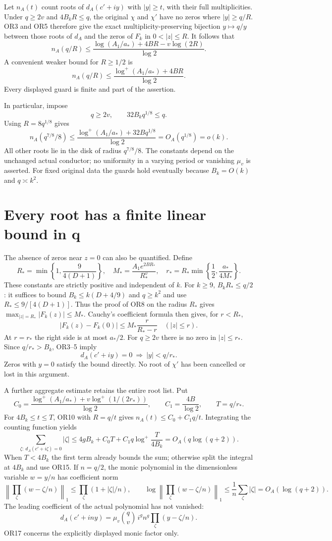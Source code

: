\documentclass[11pt]{article}
\newcommand{\lp}{\log^+}
\begin{document}
Let $n_A(t)$ count roots of $d_A(c'+iy)$ with $|y|\ge t$,
with their full multiplicities. Under $q\ge2v$ and $4B_kR\le q$,
the original $\chi$ and $\chi'$ have no zeros where $|y|\ge q/R$.
OR3 and OR5 therefore give the exact multiplicity-preserving
bijection $y\mapsto q/y$ between those roots of $d_A$ and the
zeros of $F_k$ in $0<|z|\le R$. It follows that
\[
n_A(q/R)\le
\frac{\log(A_1/a_*)+4BR-v\log(2R)}{\log2}.
\tag{OR10}
\]
A convenient weaker bound for $R\ge1/2$ is
\[
n_A(q/R)\le
\frac{\lp(A_1/a_*)+4BR}{\log2}.
\tag{OR11}
\]
Every displayed guard is finite and part of the assertion.

In particular, impose
\[
q\ge2v,\qquad 32B_kq^{1/8}\le q.
\tag{OR12}
\]
Using $R=8q^{1/8}$ gives
\[
\boxed{n_A(q^{7/8}/8)\le
\frac{\lp(A_1/a_*)+32Bq^{1/8}}{\log2}
=O_A(q^{1/8})=o(k).}
\tag{OR13}
\]
All other roots lie in the disk of radius $q^{7/8}/8$.
The constants depend on the unchanged actual conductor; no
uniformity in a varying period or vanishing $\mu_v$ is asserted.
For fixed original data the guards hold eventually because
$B_k=O(k)$ and $q\asymp k^2$.

\section{Every root has a finite linear bound in q}
The absence of zeros near $z=0$ can also be quantified. Define
\[
R_*=\min\left\{1,\frac{9}{4(D+1)}\right\},\quad
M_*=\frac{A_1e^{2BR_*}}{R_*^v},\quad
r_* = R_*\min\left\{\frac12,\frac{a_*}{4M_*}\right\}.
\tag{OR14}
\]
These constants are strictly positive and independent of $k$.
For $k\ge9$, $B_kR_*\le q/2$: it suffices to bound
$B_k\le k(D+4/9)$ and $q\ge k^2$ and use
$R_*\le9/[4(D+1)]$.
Thus the proof of OR8 on the radius $R_*$ gives
$\max_{|z|=R_*}|F_k(z)|\le M_*$.
Cauchy's coefficient formula then gives, for $r<R_*$,
\[
|F_k(z)-F_k(0)|\le M_*\frac{r}{R_*-r}
\quad(|z|\le r).
\]
At $r=r_*$ the right side is at most $a_*/2$.
For $q\ge2v$ there is no zero in $|z|\le r_*$.
Since $q/r_*>B_k$, OR3--5 imply
\[
\boxed{d_A(c'+iy)=0\ \Longrightarrow\ |y|<q/r_*.}
\tag{OR15}
\]
Zeros with $y=0$ satisfy the bound directly. No root of $\chi'$
has been cancelled or lost in this argument.

A further aggregate estimate retains the entire root list. Put
\[
C_0=\frac{\lp(A_1/a_*)+v\lp(1/(2r_*))}{\log2},\qquad
C_1=\frac{4B}{\log2},\qquad T=q/r_*.
\]
For $4B_k\le t\le T$, OR10 with $R=q/t$ gives
$n_A(t)\le C_0+C_1q/t$. Integrating the counting function yields
\[
\boxed{\sum_{\zeta:\ d_A(c'+i\zeta)=0}|\zeta|
\le 4gB_k+C_0T+C_1q\lp\frac{T}{4B_k}
=O_A(q\log(q+2)).}
\tag{OR16}
\]
When $T<4B_k$ the first term already bounds the sum; otherwise split
the integral at $4B_k$ and use OR15. If $n=q/2$, the monic polynomial
in the dimensionless variable $w=y/n$ has coefficient norm
\[
\left\|\prod_\zeta(w-\zeta/n)\right\|_1
\le\prod_\zeta(1+|\zeta|/n),\qquad
\log\left\|\prod_\zeta(w-\zeta/n)\right\|_1
\le\frac1n\sum_\zeta|\zeta|=O_A(\log(q+2)).
\tag{OR17}
\]
The leading coefficient of the actual polynomial has not vanished:
\[
d_A(c'+iny)=\mu_v\binom qv\,i^g n^g
                 \prod_\zeta(y-\zeta/n).
\]
OR17 concerns the explicitly displayed monic factor only.
\end{document}
